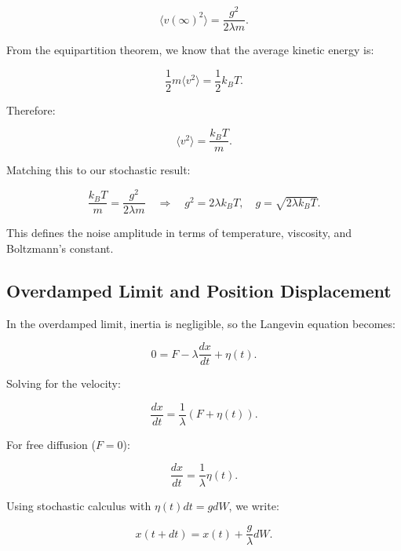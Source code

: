 \begin{equation}
  \langle v(\infty)^2 \rangle = \frac{g^2}{2 \lambda m} \text{.}
\end{equation}

From the equipartition theorem, we know that the average kinetic energy is:

\[
  \frac{1}{2} m \langle v^2 \rangle = \frac{1}{2} k_B T \text{.}
\]

Therefore:

\begin{equation}
  \langle v^2 \rangle = \frac{k_B T}{m} \text{.}
\end{equation}

Matching this to our stochastic result:

\begin{equation}
  \frac{k_B T}{m} = \frac{g^2}{2 \lambda m} \quad \Rightarrow \quad g^2 = 2 \lambda k_B T, \quad g = \sqrt{2 \lambda k_B T} \text{.}
\end{equation}

This defines the noise amplitude in terms of temperature, viscosity, and Boltzmann’s constant.

\subsection{Overdamped Limit and Position Displacement}

In the overdamped limit, inertia is negligible, so the Langevin equation becomes:

\begin{equation}
  0 = F - \lambda \frac{dx}{dt} + \eta(t) \text{.}
\end{equation}

Solving for the velocity:

\begin{equation}
  \frac{dx}{dt} = \frac{1}{\lambda} (F + \eta(t)) \text{.}
\end{equation}

For free diffusion (\( F = 0 \)):

\begin{equation}
  \frac{dx}{dt} = \frac{1}{\lambda} \eta(t) \text{.}
\end{equation}

Using stochastic calculus with \( \eta(t) dt = g dW \), we write:

\begin{equation}
  x(t + dt) = x(t) + \frac{g}{\lambda} dW \text{.}
\end{equation}

